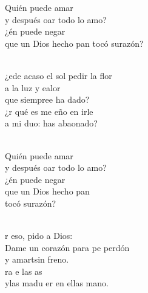 \begin{cancion}%
	\begin{chorus}%
	Quién puede amar \\
	y después oar todo lo amo?\\
	¿én puede negar  \\
	que un Dios hecho pan tocó surazón?\\
	\end{chorus}%
	\jump\\
	¿ede acaso el sol pedir la flor \\
	a la luz y ealor \\
	que siempree ha dado?\\
	¿r qué es me eño en irle \\
	a mi duo: has abaonado?\\\jump\\
	\begin{chorus}%
	Quién puede amar \\
	y después oar todo lo amo? \\
	¿én puede negar  \\
que un Dios hecho pan \\
	tocó surazón?    \\
	\end{chorus}%
	\jump\\
	r eso, pido a Dios: \\
	Dame un corazón para pe perdón\\
	y amartsin freno.\\
	ra e las as \\
	ylas madu er en ellas  mano.\\
\end{cancion}%
